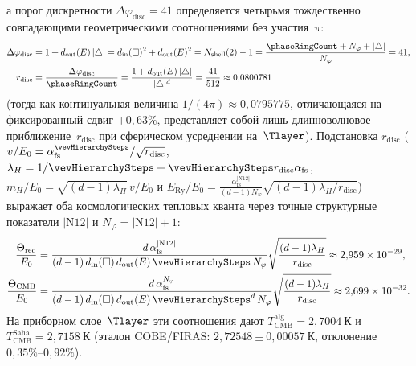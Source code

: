 \begin{theorem}
\begin{enumerate}[leftmargin=*]
\[\begin{aligned}
  \end{aligned}
  \]
  а порог дискретности $\Delta\varphi_{\mathrm{disc}} = 41$ определяется четырьмя тождественно совпадающими геометрическими соотношениями без участия~$\pi$:
  \begin{equation}
  \label{eq:cosmo-rdisc-geometric}
  \begin{aligned}
    \Delta\varphi_{\mathrm{disc}}
    &= 1 + d_{\mathrm{out}}(E)\,|\triangle|
    = d_{\mathrm{in}}(\square)^2 + d_{\mathrm{out}}(E)^2
    = N_{\mathrm{shell}}(2) - 1
    = \frac{\phaseRingCount + N_\varphi + |\triangle|}{N_\varphi}
    = 41,\\
    r_{\mathrm{disc}}
    &= \frac{\Delta\varphi_{\mathrm{disc}}}{\phaseRingCount}
    = \frac{1 + d_{\mathrm{out}}(E)\,|\triangle|}{|\triangle|^d}
    = \frac{41}{512} \approx 0{,}0800781
  \end{aligned}
  \end{equation}
  (тогда как континуальная величина $1/(4\pi) \approx 0{,}0795775$, отличающаяся на фиксированный сдвиг $+0{,}63\%$, представляет собой лишь длинноволновое приближение~$r_{\mathrm{disc}}$ при сферическом усреднении на~$\Tlayer$).
  Подстановка $r_{\mathrm{disc}}$ ($v/E_0 = \alpha_{\mathrm{fs}}^{\vevHierarchySteps}/\sqrt{r_{\mathrm{disc}}}$, $\lambda_H = 1/\vevHierarchySteps + \vevHierarchySteps r_{\mathrm{disc}}\alpha_{\mathrm{fs}}$, $m_H/E_0 = \sqrt{(d-1)\lambda_H}\,v/E_0$ и $E_{\mathrm{Ry}}/E_0 = \frac{\alpha_{\mathrm{fs}}^{|\mathrm{N12}|}}{(d-1)N_\varphi}\sqrt{(d-1)\lambda_H/r_{\mathrm{disc}}}$) выражает оба космологических тепловых кванта через точные структурные показатели $|\mathrm{N12}|$ и $N_\varphi = |\mathrm{N12}| + 1$:
  \begin{equation}
  \label{eq:cosmo-theta-cmb-in-e0}
  \begin{aligned}
    \frac{\Theta_{\mathrm{rec}}}{E_0}
    &= \frac{d\,\alpha_{\mathrm{fs}}^{|\mathrm{N12}|}}{(d-1)\,d_{\mathrm{in}}(\square)\,d_{\mathrm{out}}(E)\,\vevHierarchySteps\,N_\varphi}\sqrt{\frac{(d-1)\lambda_H}{r_{\mathrm{disc}}}}
    \approx 2{,}959\times 10^{-29},\\
    \frac{\Theta_{\mathrm{CMB}}}{E_0}
    &= \frac{d\,\alpha_{\mathrm{fs}}^{N_\varphi}}{(d-1)\,d_{\mathrm{in}}(\square)\,d_{\mathrm{out}}(E)\,\vevHierarchySteps^{d}\,N_\varphi}\sqrt{\frac{(d-1)\lambda_H}{r_{\mathrm{disc}}}}
    \approx 2{,}699\times 10^{-32}.
  \end{aligned}
  \end{equation}
  На приборном слое~$\Tlayer$ эти соотношения дают $T_{\mathrm{CMB}}^{\mathrm{alg}} = 2{,}7004\ \mathrm{К}$ и $T_{\mathrm{CMB}}^{\mathrm{Saha}} = 2{,}7158\ \mathrm{К}$ (эталон COBE/FIRAS: $2{,}72548 \pm 0{,}00057\ \mathrm{К}$, отклонение $0{,}35\%\text{--}0{,}92\%$).
\end{enumerate}
\end{theorem}

